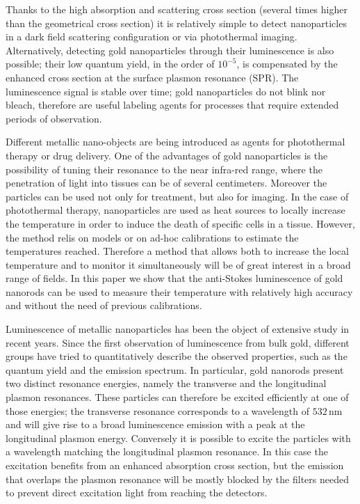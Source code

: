 \documentclass[journal=nalefd,manuscript=letter]{achemso}
\newcommand{\nm}{\ensuremath{\,\textrm{nm}}}
\begin{document}
Thanks to the high absorption and scattering cross section (several times higher than
the geometrical cross section) it is relatively simple 
to detect nanoparticles in a dark field scattering configuration\cite{Hu2008} or
via photothermal imaging\cite{boyer2002photothermal, Berciaud2006}. 
Alternatively, detecting gold nanoparticles through
their luminescence\cite{Tcherniak2011} is also possible; their low quantum
yield\cite{Fang2012,Rao2015,Yorulmaz2012,Cheng2015}, in the order of $10^{-5}$,
is compensated by the enhanced cross section at the surface plasmon resonance (SPR). 
The luminescence signal is stable over time; gold nanoparticles do not blink nor bleach, 
therefore are useful labeling agents for processes that require extended periods of
observation\cite{Wang2005}.


Different metallic nano-objects are being introduced as agents for photothermal
therapy\cite{Huang2006,Huang2008} or drug delivery\cite{Kang2013}. One of the
advantages of gold nanoparticles is the possibility of tuning their resonance to
the near infra-red range, where the penetration of light into tissues can be of
several centimeters\cite{Huang2006,Gobin2007,Hirsch2003,ONeal2004,Li2013c,Huang2008}.
Moreover the particles can be used not only for treatment, but also for
imaging\cite{Zhao2014a,Huang2006}. In the case of photothermal therapy, 
nanoparticles are used as heat sources\cite{Gobin2007,Hirsch2003} to locally increase the
temperature in order to induce the death of specific cells in a
tissue\cite{Huang2008,Huang2006}. However, the method relis on models\cite{Zhao2014a} 
or on ad-hoc calibrations to estimate the temperatures reached\cite{Donner2013}. 
Therefore a method that allows both to increase the
local temperature and to monitor it simultaneously 
will be of great interest in a broad range of fields.
In this paper we show that the anti-Stokes
luminescence of gold nanorods can be used to measure their
temperature with relatively high accuracy and without the need of previous calibrations.

Luminescence of metallic nanoparticles has been the object of extensive study in
recent years. Since the first observation of luminescence from bulk
gold\cite{Mooradian1969}, different groups have tried to quantitatively describe
the observed properties\cite{Mohamed2000,Beversluis2003a}, such as the quantum
yield\cite{Fang2012,Rao2015,Yorulmaz2012,Cheng2015,Dulkeith2004} and the
emission spectrum\cite{Link2010}. In particular, gold nanorods present two distinct
resonance energies, namely the transverse and the longitudinal plasmon
resonances. These particles can therefore be excited efficiently at one of those
energies; the transverse resonance corresponds to a wavelength of $532\nm$ and will give
rise to a broad luminescence emission with a peak at the longitudinal plasmon energy.
Conversely it is possible to excite the particles with a wavelength matching
the longitudinal plasmon resonance. In this case the excitation benefits from
an enhanced absorption cross section, but the emission that overlaps the plasmon
resonance will be mostly blocked by the filters needed to prevent direct
excitation light from reaching the detectors.
\end{document}
